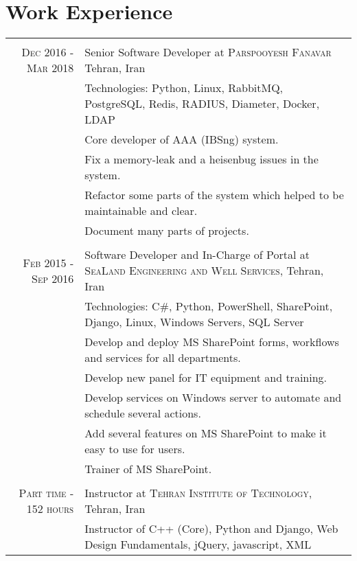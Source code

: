 \documentclass[a4paper,11pt]{article}
\begin{document}
\section{Work Experience}
\begin{tabular}{r|p{11cm}}

    \multicolumn{2}{c}{}\\
    \textsc{Dec 2016 - Mar 2018}
    & Senior Software Developer at \textsc{Parspooyesh Fanavar}
    Tehran, Iran\\
    &\footnotesize{Technologies: Python, Linux, RabbitMQ, PostgreSQL, Redis, RADIUS, Diameter, Docker, LDAP}\\
    &\footnotesize{Core developer of AAA (IBSng) system.}\\
    &\footnotesize{Fix a memory-leak and a heisenbug issues in the system.}\\
    &\footnotesize{Refactor some parts of the system which helped to be maintainable and clear.}\\
    &\footnotesize{Document many parts of projects.}\\

    \multicolumn{2}{c}{}\\
    \textsc{Feb 2015 - Sep 2016}
    & Software Developer and In-Charge of Portal at \textsc{SeaLand Engineering and Well Services},
    Tehran, Iran\\
    &\footnotesize{Technologies: C\#, Python, PowerShell, SharePoint, Django, Linux,  Windows Servers, SQL Server}\\
    &\footnotesize{Develop and deploy MS SharePoint forms, workflows and services for all departments.}\\
    &\footnotesize{Develop new panel for IT equipment and training.}\\
    &\footnotesize{Develop services on Windows server to automate and schedule several actions.}\\
    &\footnotesize{Add several features on MS SharePoint to make it easy to use for users.}\\
    &\footnotesize{Trainer of MS SharePoint.}\\

    \multicolumn{2}{c}{}\\
    \textsc{Part time - 152 hours}
    & Instructor at \textsc{Tehran Institute of Technology},
    Tehran, Iran\\
    &\footnotesize{Instructor of C++ (Core), Python and Django, Web Design Fundamentals, jQuery, javascript, XML}\\


\end{tabular}
\end{document}
